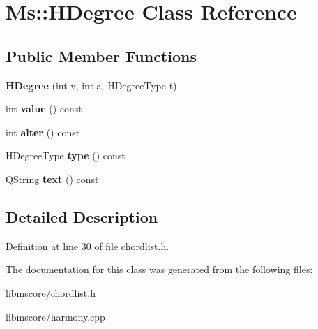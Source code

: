 \hypertarget{class_ms_1_1_h_degree}{}\section{Ms\+:\+:H\+Degree Class Reference}
\label{class_ms_1_1_h_degree}
\subsection*{Public Member Functions}
\begin{DoxyCompactItemize}
\item 
\mbox{\label{class_ms_1_1_h_degree_acabb9c184baf6ba506eb4235442e268d}} 
{\bfseries H\+Degree} (int v, int a, H\+Degree\+Type t)
\item 
\mbox{\label{class_ms_1_1_h_degree_ad6e3dcf6420226097f92442025f54bb2}} 
int {\bfseries value} () const
\item 
\mbox{\label{class_ms_1_1_h_degree_afc0517b690daae66f872b1edd8e5c9fa}} 
int {\bfseries alter} () const
\item 
\mbox{\label{class_ms_1_1_h_degree_adcbd784f70860d99e6a52c7d872be95c}} 
H\+Degree\+Type {\bfseries type} () const
\item 
\mbox{\label{class_ms_1_1_h_degree_a99c9712db42c337d1b3315dab4f15428}} 
Q\+String {\bfseries text} () const
\end{DoxyCompactItemize}


\subsection{Detailed Description}


Definition at line 30 of file chordlist.\+h.



The documentation for this class was generated from the following files\+:\begin{DoxyCompactItemize}
\item 
libmscore/chordlist.\+h\item 
libmscore/harmony.\+cpp\end{DoxyCompactItemize}
